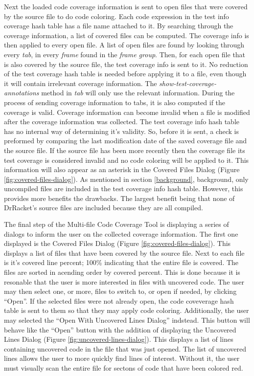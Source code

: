 Next the loaded code coverage information is sent to open files that were covered by the source file to do code coloring. Each code expression in the test info coverage hash table has a file name attached to it. By searching through the coverage information, a list of covered files can be computed. The coverage info is then applied to every open file. A list of open files are found by looking through every \emph{tab}, in every \emph{frame} found in the \emph{frame group}. Then, for each open file that is also covered by the source file, the test coverage info is sent to it. No reduction of the test coverage hash table is needed before applying it to a file, even though it will contain irrelevant coverage information. The \emph{show-test-coverage-annotations} method in \emph{tab} will only use the relevant information. During the process of sending coverage information to tabs, it is also computed if the coverage is valid. Coverage information can become invalid when a file is modified after the coverage information was collected. The test coverage info hash table has no internal way of determining it's validity. So, before it is sent, a check is preformed by comparing the last modification date of the saved coverage file and the source file. If the source file has been more recently then the coverage file its test coverage is considered invalid and no code coloring will be applied to it. This information will also appear as an asterisk in the Covered Files Dialog (Figure \ref{fig:covered-files-dialog}). As mentioned in section \ref{background}, background, only uncompiled files are included in the test coverage info hash table. However, this provides more benefits the drawbacks. The largest benefit being that none of DrRacket's source files are included because they are all compiled.


The final step of the Multi-file Code Coverage Tool is displaying a series of dialogs to inform the user on the collected coverage information. The first one displayed is the Covered Files Dialog (Figure \ref{fig:covered-files-dialog}). This displays a list of files that have been covered by the source file. Next to each file is it's covered line percent; 100\% indicating that the entire file is covered. The files are sorted in acending order by covered percent. This is done because it is resonable that the user is more interested in files with uncovered code. The user may then select one, or more, files to switch to, or open if needed, by clicking ``Open''. If the selected files were not already open, the code coveverage hash table is sent to them so that they may apply code coloring. Additionally, the user may selected the ``Open With Uncovered Lines Dialog'' indstead. This button will behave like the ``Open'' button with the addition of displaying the Uncovered Lines Dialog (Figure \ref{fig:uncovered-lines-dialog}). This displays a list of lines containing uncovered code in the file that was just opened. The list of uncovered lines allows the user to more quickly find lines of interest. Without it, the user must visually scan the entire file for sectons of code that have been colored red.


